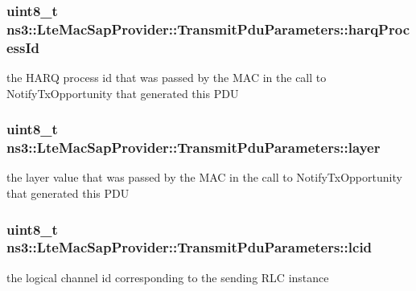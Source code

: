 \subsubsection[{\texorpdfstring{harq\+Process\+Id}{harqProcessId}}]{\setlength{\rightskip}{0pt plus 5cm}uint8\+\_\+t ns3\+::\+Lte\+Mac\+Sap\+Provider\+::\+Transmit\+Pdu\+Parameters\+::harq\+Process\+Id}\hypertarget{structns3_1_1LteMacSapProvider_1_1TransmitPduParameters_aa1394fb0cdd9851ec0920c6af56260ff}{}\label{structns3_1_1LteMacSapProvider_1_1TransmitPduParameters_aa1394fb0cdd9851ec0920c6af56260ff}
the H\+A\+RQ process id that was passed by the M\+AC in the call to Notify\+Tx\+Opportunity that generated this P\+DU 
\subsubsection[{\texorpdfstring{layer}{layer}}]{\setlength{\rightskip}{0pt plus 5cm}uint8\+\_\+t ns3\+::\+Lte\+Mac\+Sap\+Provider\+::\+Transmit\+Pdu\+Parameters\+::layer}\hypertarget{structns3_1_1LteMacSapProvider_1_1TransmitPduParameters_acda6b741e598f42fe396971f5bc7a7a3}{}\label{structns3_1_1LteMacSapProvider_1_1TransmitPduParameters_acda6b741e598f42fe396971f5bc7a7a3}
the layer value that was passed by the M\+AC in the call to Notify\+Tx\+Opportunity that generated this P\+DU 
\subsubsection[{\texorpdfstring{lcid}{lcid}}]{\setlength{\rightskip}{0pt plus 5cm}uint8\+\_\+t ns3\+::\+Lte\+Mac\+Sap\+Provider\+::\+Transmit\+Pdu\+Parameters\+::lcid}\hypertarget{structns3_1_1LteMacSapProvider_1_1TransmitPduParameters_a1aeffc9e47e7ecda7630ad4d0dd88506}{}\label{structns3_1_1LteMacSapProvider_1_1TransmitPduParameters_a1aeffc9e47e7ecda7630ad4d0dd88506}
the logical channel id corresponding to the sending R\+LC instance 
